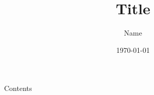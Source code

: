 \documentclass[11pt]{article}
\title{Title}
\author{Name}
\date{\today}
\begin{document}
\maketitle
Contents
\end{document}

